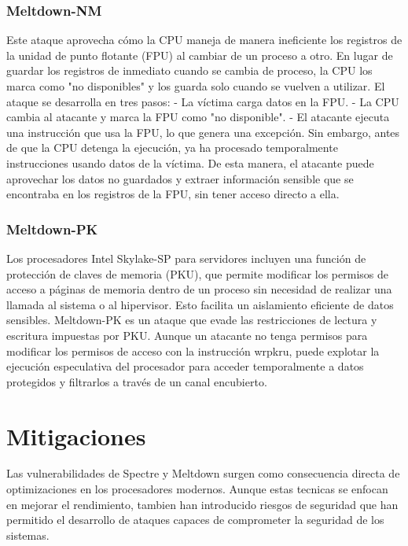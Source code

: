 \documentclass[lettersize,compsoc]{IEEEtran}
\begin{document}
\subsubsection{\textbf{Meltdown-NM}}
Este ataque aprovecha cómo la CPU maneja de manera ineficiente los registros de la unidad de punto flotante (FPU) al cambiar de un proceso a otro. En lugar de guardar los registros de inmediato cuando se cambia de proceso, la CPU los marca como "no disponibles" y los guarda solo cuando se vuelven a utilizar.
\newline
El ataque se desarrolla en tres pasos:
- La víctima carga datos en la FPU.
- La CPU cambia al atacante y marca la FPU como "no disponible".
- El atacante ejecuta una instrucción que usa la FPU, lo que genera una excepción. Sin embargo, antes de que la CPU detenga la ejecución, ya ha procesado temporalmente instrucciones usando datos de la víctima.
\newline De esta manera, el atacante puede aprovechar los datos no guardados y extraer información sensible que se encontraba en los registros de la FPU, sin tener acceso directo a ella. \cite{Meltdown variantes}
\subsubsection{\textbf{Meltdown-PK}}
Los procesadores Intel Skylake-SP para servidores incluyen una función de protección de claves de memoria (PKU), que permite modificar los permisos de acceso a páginas de memoria dentro de un proceso sin necesidad de realizar una llamada al sistema o al hipervisor. Esto facilita un aislamiento eficiente de datos sensibles.
\newline Meltdown-PK es un ataque que evade las restricciones de lectura y escritura impuestas por PKU. Aunque un atacante no tenga permisos para modificar los permisos de acceso con la instrucción wrpkru, puede explotar la ejecución especulativa del procesador para acceder temporalmente a datos protegidos y filtrarlos a través de un canal encubierto. \cite{Meltdown variantes}

\section{Mitigaciones}
Las vulnerabilidades de Spectre y Meltdown surgen como consecuencia directa de optimizaciones en los procesadores modernos. Aunque estas tecnicas se enfocan en mejorar el rendimiento, tambien han introducido riesgos de seguridad que han permitido el desarrollo de ataques capaces de comprometer la seguridad de los sistemas.
\end{document}
